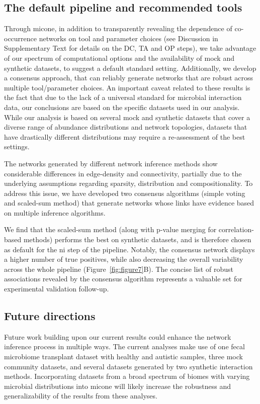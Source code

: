   \subsection*{The default pipeline and recommended tools}

  Through \ac{micone}, in addition to transparently revealing the dependence of co-occurrence networks on tool and parameter choices (see Discussion in Supplementary Text for details on the DC, TA and OP steps), we take advantage of our spectrum of computational options and the availability of mock and synthetic datasets, to suggest a default standard setting.
  Additionally, we develop a consensus approach, that can reliably generate networks that are robust across multiple tool/parameter choices.
  An important caveat related to these results is the fact that due to the lack of a universal standard for microbial interaction data, our conclusions are based on the specific datasets used in our analysis.
  While our analysis is based on several mock and synthetic datasets that cover a diverse range of abundance distributions and network topologies, datasets that have drastically different distributions may require a re-assessment of the best settings.

  The networks generated by different network inference methods show considerable differences in edge-density and connectivity, partially due to the underlying assumptions regarding sparsity, distribution and compositionality.
  To address this issue, we have developed two consensus algorithms (simple voting and scaled-sum method) that generate networks whose links have evidence based on multiple inference algorithms.

 We find that the scaled-sum method (along with p-value merging for correlation-based methods) performs the best on synthetic datasets, and is therefore chosen as default for the \ac{ni} step of the pipeline. Notably, the consensus network displays a higher number of true positives, while also decreasing the overall variability across the whole pipeline (Figure~\ref{fig:figure7}B). The concise list of robust associations revealed by the consensus algorithm represents a valuable set for experimental validation follow-up. 

  \subsection*{Future directions}

  Future work building upon our current results could enhance the network inference process in multiple ways.
  The current analyses make use of one fecal microbiome transplant dataset with healthy and autistic samples, three mock community datasets, and several datasets generated by two synthetic interaction methods.
  Incorporating datasets from a broad spectrum of biomes with varying microbial distributions into \ac{micone} will likely increase the robustness and generalizability of the results from these analyses.

